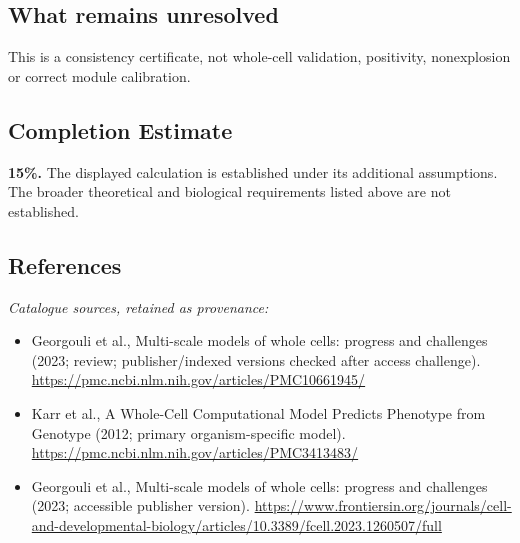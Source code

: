 \documentclass[11pt]{article}
\begin{document}
\subsection{What remains unresolved}
This is a consistency certificate, not whole-cell validation, positivity, nonexplosion or correct module calibration.
\subsection{Completion Estimate}
\textbf{15\%.} The displayed calculation is established under its additional assumptions. The broader theoretical and biological requirements listed above are not established.
\subsection{References}
\noindent\emph{Catalogue sources, retained as provenance:}
\begin{itemize}
\item Georgouli et al., Multi-scale models of whole cells: progress and challenges (2023; review; publisher/indexed versions checked after access challenge). \url{https://pmc.ncbi.nlm.nih.gov/articles/PMC10661945/}
\item Karr et al., A Whole-Cell Computational Model Predicts Phenotype from Genotype (2012; primary organism-specific model). \url{https://pmc.ncbi.nlm.nih.gov/articles/PMC3413483/}
\item Georgouli et al., Multi-scale models of whole cells: progress and challenges (2023; accessible publisher version). \url{https://www.frontiersin.org/journals/cell-and-developmental-biology/articles/10.3389/fcell.2023.1260507/full}
\end{itemize}
\clearpage


\appendix
\end{document}
